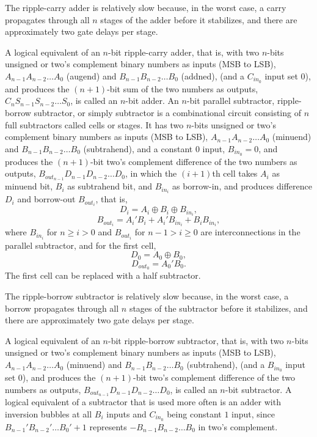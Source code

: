 \documentclass[a4paper,12pt]{report}
\begin{document}
The ripple-carry adder is relatively slow because, in the worst case, a carry propagates through all $n$ stages of the adder before it stabilizes, and there are approximately two gate delays per stage.

A logical equivalent of an $n$-bit ripple-carry adder, that is, with two $n$-bits unsigned or two's complement binary numbers as inputs (MSB to LSB), $A_{n-1}A_{n-2}\ldots A_0$ (augend) and $B_{n-1}B_{n-2}\ldots B_0$ (addned), (and a $C_{in_0}$ input set 0), and produces the $(n+1)$-bit sum of the two numbers as outputs, $C_nS_{n-1}S_{n-2}\ldots S_0$, is called an $n$-bit adder.
An $n$-bit parallel subtractor, ripple-borrow subtractor, or simply subtractor is a combinational circuit consisting of $n$ full subtractors called cells or stages. It has two $n$-bits unsigned or two's complement binary numbers as inputs (MSB to LSB), $A_{n-1}A_{n-2}\ldots A_0$ (minuend) and $B_{n-1}B_{n-2}\ldots B_0$ (subtrahend), and a constant $0$ input, $B_{in_0}=0$, and produces the $(n+1)$-bit two's complement difference of the two numbers as outputs, $B_{out_{n-1}}D_{n-1}D_{n-2}\ldots D_0$, in which the $(i+1)$th cell takes $A_i$ as minuend bit, $B_i$ as subtrahend bit, and $B_{in_i}$ as borrow-in, and produces difference $D_i$ and borrow-out $B_{out_i}$, that is,
\[D_i=A_i\oplus B_i\oplus B_{in_i},\]
\[B_{out_i}=A_i'B_i+A_i'B_{in_i}+B_iB_{in_i},\]
where $B_{in_i}$ for $n\geq i>0$ and $B_{out_i}$ for $n-1>i\geq 0$ are interconnections in the parallel subtractor, and for the first cell,
\[D_0=A_0\oplus B_0,\]
\[D_{out_0}=A_0'B_0.\]
The first cell can be replaced with a half subtractor.

The ripple-borrow subtractor is relatively slow because, in the worst case, a borrow propagates through all $n$ stages of the subtractor before it stabilizes, and there are approximately two gate delays per stage.

A logical equivalent of an $n$-bit ripple-borrow subtractor, that is, with two $n$-bits unsigned or two's complement binary numbers as inputs (MSB to LSB), $A_{n-1}A_{n-2}\ldots A_0$ (minuend) and $B_{n-1}B_{n-2}\ldots B_0$ (subtrahend), (and a $B_{in_0}$ input set 0), and produces the $(n+1)$-bit two's complement difference of the two numbers as outputs, $B_{out_{n-1}}D_{n-1}D_{n-2}\ldots D_0$, is called an $n$-bit subtractor.
A logical equivalent of a subtractor that is used more often is an adder with inversion bubbles at all $B_i$ inputs and $C_{in_0}$ being constant $1$ input, since $B_{n-1}'B_{n-2}'\ldots B_0'+1$ represents $-B_{n-1}B_{n-2}\ldots B_0$ in two's complement.
\end{document}
